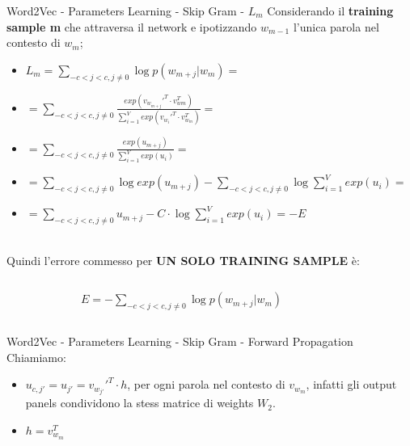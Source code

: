 \documentclass[british]{beamer}
\begin{document}
\begin{frame}{Word2Vec - Parameters Learning - Skip Gram - \(L_m\)}
	Considerando il \textbf{training sample m} che attraversa il network e ipotizzando \(w_{m-1}\) l'unica parola nel contesto di \(w_{m}\);
	\begin{itemize}
		\item \(L_m = \sum_{-c<j<c,j\neq0}\log p(w_{m+j}|w_{m}) = \)
		\item \( = \sum_{-c<j<c,j\neq0} \frac{exp(v_{w_{m+j}}'^T \cdot v_{w{m}}^T)}{\sum_{i=1}^{V} exp(v_{w_{i}}'^T \cdot v_{w_{m}}^T)} = \)
		\item \( = \sum_{-c<j<c,j\neq0} \frac{exp(u_{m+j})}{\sum_{i=1}^{V} exp(u_i)} = \)
		\item \( = \sum_{-c<j<c,j\neq0} \log exp(u_{m+j}) - \sum_{-c<j<c,j\neq0} \log \sum_{i=1}^{V} exp(u_i) = \)
		\item \( = \sum_{-c<j<c,j\neq0} u_{m+j} - C \cdot \log \sum_{i=1}^{V} exp(u_i) = -E\)
		\\~\\
	\end{itemize}
	Quindi l'errore commesso per \textbf{UN SOLO TRAINING SAMPLE} \`{e}:
	\begin{columns}
		\begin{column}{0.2\textwidth}
			
		\end{column}
		\begin{column}{0.6\textwidth}
			\(E = - \sum_{-c<j<c,j\neq0}\log p(w_{m+j}|w_{m})\)
		\end{column}
		\begin{column}{0.2\textwidth}
			
		\end{column}
	\end{columns}
\end{frame}

\begin{frame}{Word2Vec - Parameters Learning - Skip Gram - Forward Propagation}
	Chiamiamo:
	\begin{itemize}
		\item \(u_{c,j'} = u_{j'} = v_{w_{j'}}'^T \cdot h \), per ogni parola nel contesto di \(v_{w_{m}}\), infatti gli output panels condividono la stess matrice di weights \(W_2\).
		\item \(h = v_{w_{m}}^T\)
	\end{itemize} 
\end{frame}
\end{document}
